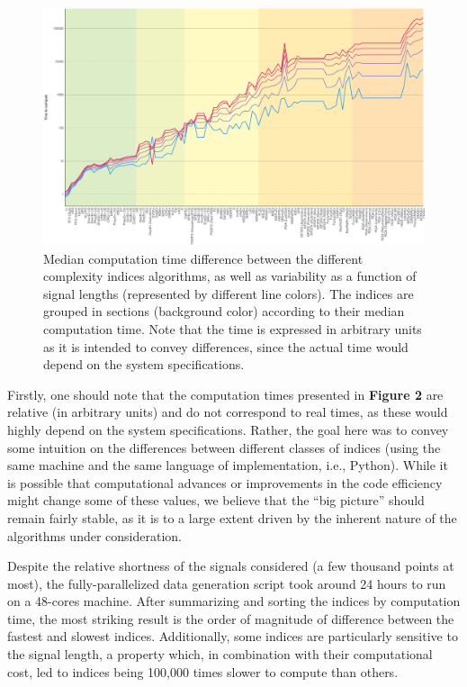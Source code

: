 \documentclass[
  man]{apa6}
\begin{document}
\begin{figure}
\centering
\includegraphics{./figures/time-1.pdf}
\caption{\label{fig:time}Median computation time difference between the different complexity indices algorithms, as well as variability as a function of signal lengths (represented by different line colors). The indices are grouped in sections (background color) according to their median computation time. Note that the time is expressed in arbitrary units as it is intended to convey differences, since the actual time would depend on the system specifications.}
\end{figure}

Firstly, one should note that the computation times presented in \textbf{Figure 2} are relative (in arbitrary units) and do not correspond to real times, as these would highly depend on the system specifications. Rather, the goal here was to convey some intuition on the differences between different classes of indices (using the same machine and the same language of implementation, i.e., Python). While it is possible that computational advances or improvements in the code efficiency might change some of these values, we believe that the ``big picture'' should remain fairly stable, as it is to a large extent driven by the inherent nature of the algorithms under consideration.

Despite the relative shortness of the signals considered (a few thousand points at most), the fully-parallelized data generation script took around 24 hours to run on a 48-cores machine. After summarizing and sorting the indices by computation time, the most striking result is the order of magnitude of difference between the fastest and slowest indices. Additionally, some indices are particularly sensitive to the signal length, a property which, in combination with their computational cost, led to indices being 100,000 times slower to compute than others.
\end{document}
